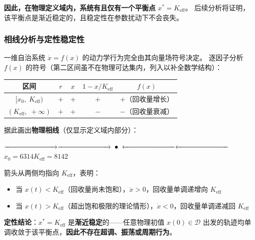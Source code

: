\documentclass[12pt,a4paper]{ctexart}
\begin{document}
\begin{table}[htbp]
\textbf{因此，在物理定义域内，系统有且仅有一个平衡点} $x^* = K_{\text{eff}}$。
后续分析将证明，该平衡点是渐近稳定的，且稳定性在参数扰动下不会丧失。

\subsubsection{相线分析与定性稳定性}

一维自治系统 $\dot{x} = f(x)$ 的动力学行为完全由其向量场符号决定。
逐因子分析 $f(x)$ 的符号（第二区间虽不在物理可达集内，列入以补全数学结构）：

\begin{center}
\begin{tabular}{c|c|c|c|c}
\toprule
区间 & $r$ & $x$ & $1 - x/K_{\text{eff}}$ & $f(x)$ \\
\midrule
$[x_0,\; K_{\text{eff}})$ & $+$ & $+$ & $+$ & $+$（回收量增长） \\
$(K_{\text{eff}},\; +\infty)$ & $+$ & $+$ & $-$ & $-$（回收量衰减） \\
\bottomrule
\end{tabular}
\end{center}

据此画出\textbf{物理相线}（仅显示定义域内部分）：
\begin{center}
$\xrightarrow{\hspace{2.5cm}} \xrightarrow{\hspace{2.5cm}}
\;\bullet\; \xleftarrow{\hspace{2.5cm}} \xleftarrow{\hspace{2.5cm}}$ \\[4pt]
$x_0 = 6314$\hspace{2cm}$K_{\text{eff}} = 8142$\hspace{2cm}
\end{center}

箭头从两侧均指向 $K_{\text{eff}}$，表明：
\begin{itemize}
  \item 当 $x(t) < K_{\text{eff}}$（回收量尚未饱和），$\dot{x} > 0$，回收量单调递增向 $K_{\text{eff}}$
  \item 当 $x(t) > K_{\text{eff}}$（超出饱和极限的理论情形），$\dot{x} < 0$，回收量单调递减回 $K_{\text{eff}}$
\end{itemize}

\textbf{定性结论}：$x^* = K_{\text{eff}}$ 是\textbf{渐近稳定}的——任意物理初值 $x(0) \in \mathcal{D}$
出发的轨迹均单调收敛于该平衡点，\textbf{因此不存在超调、振荡或周期行为}。


\end{table}
\end{document}
